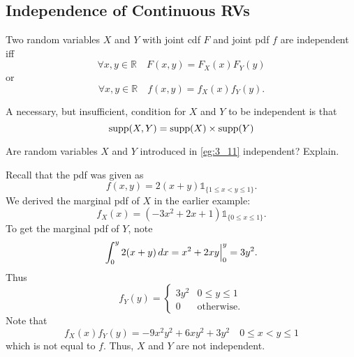 \documentclass[notoc,notitlepage]{tufte-book}
\begin{document}

\subsection{Independence of Continuous RVs}%
\label{sub:independence_of_continuous_rvs}

\begin{defn}
\label{defn:independence_of_continuous_rvs}
  Two random variables $X$ and $Y$ with joint cdf $F$ and joint pdf $f$ are independent iff
  \begin{equation*}
    \forall x, y \in \mathbb{R} \quad F(x, y) = F_X(x) F_Y(y)
  \end{equation*}
  or
  \begin{equation*}
    \forall x, y \in \mathbb{R} \quad f(x, y) = f_X(x) f_Y(y).
  \end{equation*}
\end{defn}

\begin{note}
  A necessary, but insufficient, condition for $X$ and $Y$ to be independent is that
  \begin{equation*}
    \operatorname{supp}(X, Y) = \operatorname{supp}(X) \times \operatorname{supp}(Y)
  \end{equation*}
\end{note}

\begin{eg}[Example 3.12]
  Are random variables $X$ and $Y$ introduced in \cref{eg:3_11} independent? Explain.

  \begin{solution}
    Recall that the pdf was given as
    \begin{equation*}
      f(x, y) = 2(x + y) \mathbb{1}_{\{1 \leq x < y \leq 1\}}.
    \end{equation*}
    We derived the marginal pdf of $X$ in the earlier example:
    \begin{equation*}
      f_X (x) = (-3x^2 + 2x + 1) \mathbb{1}_{\{0 \leq x \leq 1\}}.
    \end{equation*}
    To get the marginal pdf of $Y$, note
    \begin{equation*}
      \int_{0}^{y} 2(x + y) \mathop{}\!d{x} = x^2 + 2xy \Big|_{0}^{y} = 3y^2.
    \end{equation*}
    Thus
    \begin{equation*}
      f_Y(y) = \begin{cases}
        3y^2 & 0 \leq y \leq 1 \\
        0 & \text{otherwise.}
      \end{cases}
    \end{equation*}
    Note that
    \begin{equation*}
      f_X(x) f_Y(y) = -9x^2y^2 + 6xy^2 + 3y^2 \quad 0 \leq x < y \leq 1
    \end{equation*}
    which is not equal to $f$. Thus, $X$ and $Y$ are not independent.
  \end{solution}
\end{eg}
\end{document}
